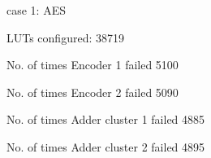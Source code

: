 case 1: AES

LUTs configured: 38719

No. of times Encoder 1 failed 5100

No. of times Encoder 2 failed 5090

No. of times Adder cluster 1 failed 4885

No. of times Adder cluster 2 failed 4895